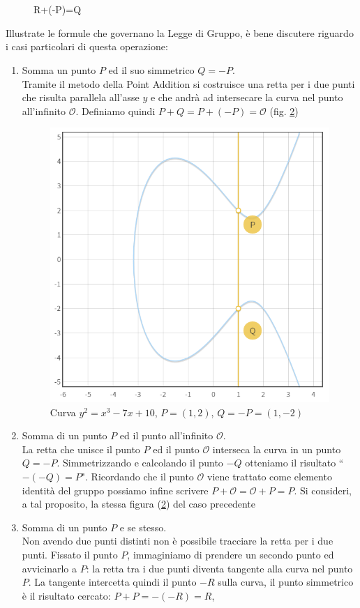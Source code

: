 \documentclass[a4paper,12pt]{tesiinfo}
\begin{document}
\begin{figure}[H]
\begin{minipage}[H]{0.5\textwidth}
  \caption{R+(-P)=Q}
  \label{PQR-}
 \end{minipage}
 \\
 \\
\end{figure}
Illustrate le formule che governano la Legge di Gruppo, \`e bene discutere riguardo i casi particolari di questa operazione:
\begin{enumerate}
 \item Somma un punto $P$ ed il suo simmetrico $Q = -P$. 
 \\
 Tramite il metodo della Point Addition si costruisce una retta per i due punti che risulta parallela all'asse $y$ e che andr\`a ad intersecare la curva nel punto all'infinito $\mathcal{O}$. Definiamo quindi $P + Q = P+(-P) = \mathcal{O}$ (fig. \ref{PA_P+(-P)})
 \begin{figure}[H]
  \includegraphics[width=.6\textwidth,center]{PA_P+(-P)}
  \caption{Curva $y^2 = x^3-7x+10$, $P=(1, 2)$, $Q=-P=(1, -2)$}
  \label{PA_P+(-P)}
 \end{figure}
 \label{CPsimmetrici}
 \item Somma di un punto $P$ ed il punto all'infinito $\mathcal{O}$. 
 \\ 
 La retta che unisce il punto $P$ ed il punto $\mathcal{O}$ interseca la curva in un punto 
 \\$Q = -P$. Simmetrizzando e calcolando il punto $-Q$ otteniamo il risultato ``$-(-Q) = P$".
 Ricordando che il punto $\mathcal{O}$ viene trattato come elemento identit\`a del gruppo possiamo infine scrivere $P+\mathcal{O} = \mathcal{O}+P = P$. Si consideri, a tal proposito, la stessa figura (\ref{PA_P+(-P)}) del caso precedente
 \item Somma di un punto $P$ e se stesso. 
 \\
 Non avendo due punti distinti non \`e possibile tracciare la retta per i due punti. Fissato il punto $P$, immaginiamo di prendere un secondo punto ed avvicinarlo a $P$: la retta tra i due punti diventa tangente alla curva nel punto $P$. La tangente intercetta quindi il punto $-R$ sulla curva, il punto simmetrico \`e il risultato cercato: $P + P = -(-R) = R$,

\end{enumerate}
\end{document}
